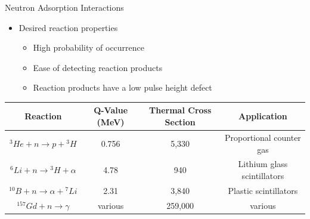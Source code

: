\begin{frame}{Neutron Adsorption Interactions}
\begin{itemize}
	\item Desired reaction properties
	\begin{itemize}
		\item High probability of occurrence
		\item Ease of detecting reaction products
		\item Reaction products have a low pulse height defect
	\end{itemize}
\end{itemize}
\begin{table}
	\tiny
	\begin{tabular}{ c | c c c} 
		Reaction                           & Q-Value (MeV) & Thermal Cross Section & Application \\
		\hline
		\hline
		${}^3He + n \to p +{}^3H$          & 0.756     & 5,330 & Proportional counter gas \\
		${}^6Li + n \to {}^3H + \alpha$    & 4.78      & 940 & Lithium glass scintillators \\
		${}^{10}B + n \to \alpha + {}^7Li$ & 2.31      & 3,840 & Plastic scintillators \\
		${}^{157}Gd + n \to \gamma$        &various    & 259,000 & various \\
	\end{tabular}
\end{table}
\end{frame}

